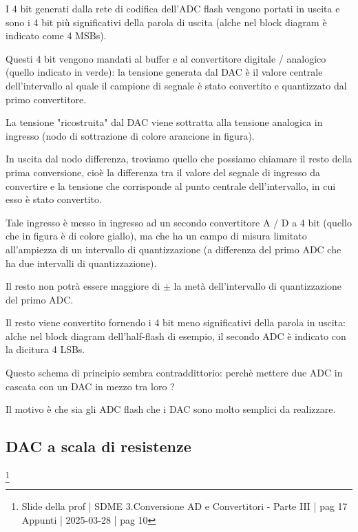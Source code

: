 I 4 bit generati dalla rete di codifica dell'ADC flash vengono portati in uscita e sono i 4 bit più significativi della parola di uscita (alche nel block diagram è indicato come 4 MSBs). \newline 

Questi 4 bit vengono mandati al buffer e al convertitore digitale / analogico (quello indicato in verde): 
la tensione generata dal DAC è il valore centrale dell'intervallo al quale il campione di segnale è stato convertito e quantizzato dal primo convertitore. \newline 

La tensione "ricostruita" dal DAC viene sottratta alla tensione analogica in ingresso (nodo di sottrazione di colore arancione in figura). \newline 

In uscita dal nodo differenza, troviamo quello che possiamo chiamare il resto della prima conversione, cioè la differenza tra il valore del segnale di ingresso da convertire e la tensione che corrisponde al punto centrale dell'intervallo, in cui esso è stato convertito. \newline 

Tale ingresso è messo in ingresso ad un secondo convertitore A / D a 4 bit (quello che in figura è di colore giallo), 
ma che ha un campo di misura limitato all'ampiezza di un intervallo di quantizzazione (a differenza del primo ADC che ha due intervalli di quantizzazione). \newline 

Il resto non potrà essere maggiore di $\pm$ la metà dell'intervallo di quantizzazione del primo ADC. \newline 

Il resto viene convertito fornendo i 4 bit meno significativi della parola in uscita: alche nel block diagram dell'half-flash di esempio, 
il secondo ADC è indicato con la dicitura 4 LSBs. \newline 


Questo schema di principio sembra contraddittorio: perchè mettere due ADC in cascata con un DAC in mezzo tra loro ? \newline 

Il motivo è che sia gli ADC flash che i DAC sono molto semplici da realizzare. \newline 

\newpage 


\subsection{DAC a scala di resistenze}
\footnote{Slide della prof | SDME 3.Conversione AD e Convertitori - Parte III | pag 17 \\  
Appunti | 2025-03-28 | pag 10}


